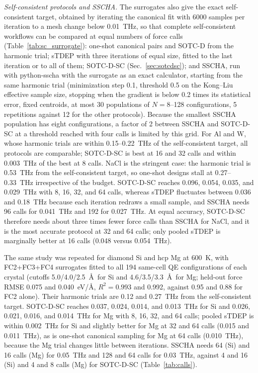 \documentclass[aip,jap,reprint,amsmath,amssymb,floatfix]{revtex4-2}
\begin{document}
\textit{Self-consistent protocols and SSCHA.} The surrogates also give the
exact self-consistent target, obtained by iterating the canonical fit with
6000 samples per iteration to a mesh change below 0.01~THz, so that complete
self-consistent workflows can be compared at equal numbers of force calls
(Table~\ref{tab:sc_surrogate}): one-shot canonical pairs and SOTC-D from the
harmonic trial; sTDEP with three iterations of equal size, fitted to the last
iteration or to all of them; SOTC-D-SC (Sec.~\ref{sec:sotcdsc}); and SSCHA,
run with python-sscha \cite{ref50} with the surrogate as an exact calculator,
starting from the same harmonic trial (minimization step 0.1, threshold 0.5 on the
Kong--Liu effective sample size, stopping when the gradient is below 0.2
times its statistical error, fixed centroids, at most 30
populations of $N=8$--128 configurations, 5 repetitions against 12 for the
other protocols). Because the smallest SSCHA population has eight
configurations, a factor of 2 between SSCHA and SOTC-D-SC at a threshold
reached with four calls is limited by this grid. For Al and W, whose harmonic trials are
within 0.15--0.22~THz of the self-consistent target, all protocols are
comparable; SOTC-D-SC is best at 16 and 32 calls and within 0.003~THz of
the best at 8 calls. NaCl is the stringent case: the harmonic trial is
0.53~THz from the self-consistent target, so one-shot designs stall at
0.27--0.33~THz irrespective of the budget. SOTC-D-SC reaches 0.096, 0.054,
0.035, and 0.029~THz with 8, 16, 32, and 64 calls, whereas sTDEP fluctuates
between 0.036 and 0.18~THz because each iteration redraws a small sample, and
SSCHA needs 96 calls for 0.041~THz and 192 for 0.027~THz. At equal accuracy,
SOTC-D-SC therefore needs about three times fewer force calls than SSCHA for
NaCl, and it is the most accurate protocol at 32 and 64 calls; only pooled
sTDEP is marginally better at 16 calls (0.048 versus 0.054~THz).

The same study was repeated for diamond Si and hcp Mg at 600~K, with
FC2+FC3+FC4 surrogates fitted to all 194 same-cell QE configurations of each
crystal (cutoffs 5.0/4.0/2.5~\AA\ for Si and 4.6/3.5/3.3~\AA\ for Mg; held-out
force RMSE 0.075 and 0.040~eV/\AA, $R^2=0.993$ and 0.992, against 0.95 and 0.88
for FC2 alone). Their harmonic trials are 0.12 and 0.27~THz from the
self-consistent target. SOTC-D-SC reaches 0.037, 0.024, 0.014, and
0.013~THz for Si and 0.026, 0.021, 0.016, and 0.014~THz for Mg with 8, 16,
32, and 64 calls; pooled sTDEP is within 0.002~THz for Si and slightly better for Mg at
32 and 64 calls (0.015 and 0.011~THz), as is one-shot canonical sampling for
Mg at 64 calls (0.010~THz), because the Mg trial changes little between
iterations. SSCHA needs 64 (Si) and 16 calls (Mg) for 0.05~THz and 128 and
64 calls for 0.03~THz, against 4 and 16 (Si) and 4 and 8 calls (Mg) for
SOTC-D-SC (Table~\ref{tab:calls}).
\end{document}
